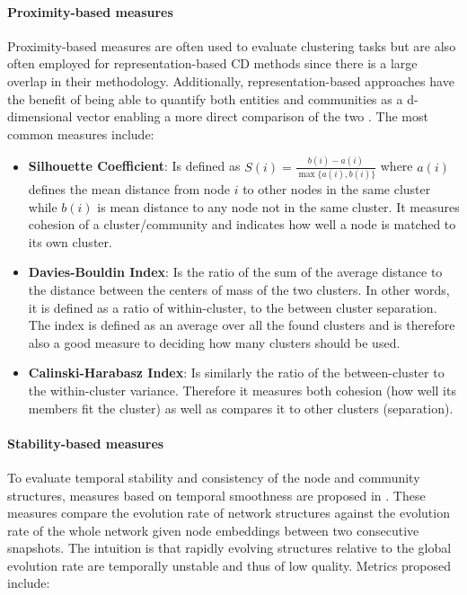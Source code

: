 \documentclass[
acmsmall,
nonacm,
screen,
acmthm]{../../scripts/pandoc/templates/acmart}
\providecommand{\tightlist}{%
\setlength{\itemsep}{0pt}\setlength{\parskip}{0pt}}
\begin{document}
\hypertarget{proximity-based-measures}{%
\paragraph{Proximity-based measures}\label{proximity-based-measures}}

Proximity-based measures are often used to evaluate clustering tasks but
are also often employed for representation-based CD methods since there
is a large overlap in their methodology. Additionally,
representation-based approaches have the benefit of being able to
quantify both entities and communities as a d-dimensional vector
enabling a more direct comparison of the two
\citep{wangVehicleTrajectoryClustering2020}. The most common measures
include:

\begin{itemize}
\tightlist
\item
  \textbf{Silhouette Coefficient}: Is defined as
  \(S(i)=\frac{b(i)-a(i)}{\max \{a(i), b(i)\}}\) where \(a(i)\) defines
  the mean distance from node \(i\) to other nodes in the same cluster
  while \(b(i)\) is mean distance to any node not in the same cluster.
  It measures cohesion of a cluster/community and indicates how well a
  node is matched to its own cluster.
\item
  \textbf{Davies-Bouldin Index}: Is the ratio of the sum of the average
  distance to the distance between the centers of mass of the two
  clusters. In other words, it is defined as a ratio of within-cluster,
  to the between cluster separation. The index is defined as an average
  over all the found clusters and is therefore also a good measure to
  deciding how many clusters should be used.
\item
  \textbf{Calinski-Harabasz Index}: Is similarly the ratio of the
  between-cluster to the within-cluster variance. Therefore it measures
  both cohesion (how well its members fit the cluster) as well as
  compares it to other clusters (separation).
\end{itemize}

\hypertarget{stability-based-measures}{%
\paragraph{Stability-based measures}\label{stability-based-measures}}

To evaluate temporal stability and consistency of the node and community
structures, measures based on temporal smoothness are proposed in
\citet{maCommunityawareDynamicNetwork2020}. These measures compare the
evolution rate of network structures against the evolution rate of the
whole network given node embeddings between two consecutive snapshots.
The intuition is that rapidly evolving structures relative to the global
evolution rate are temporally unstable and thus of low quality. Metrics
proposed include:
\end{document}
